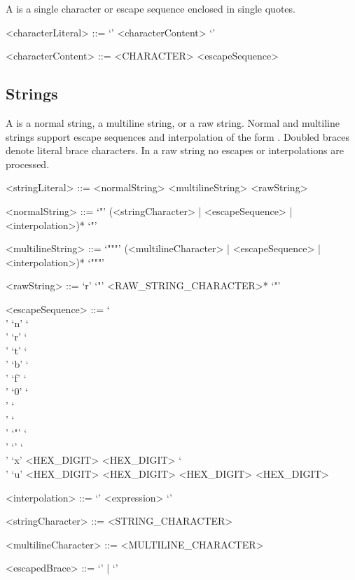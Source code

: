 \documentclass[makeidx]{article}
\begin{document}
\LMHash{}%
A  is a single character
or escape sequence enclosed in single quotes.

\begin{grammar}
<characterLiteral> ::= `\sq' <characterContent> `\sq'

<characterContent> ::= <CHARACTER>
  \alt <escapeSequence>
\end{grammar}

\subsection{Strings}

\LMHash{}%
A  is a normal string, a multiline string,
or a raw string.
Normal and multiline strings support escape sequences
and interpolation of the form .
Doubled braces denote literal brace characters.
In a raw string no escapes or interpolations are processed.

\begin{grammar}
<stringLiteral> ::= <normalString>
  \alt <multilineString>
  \alt <rawString>

<normalString> ::= `"' (<stringCharacter> | <escapeSequence>
  \gnewline{} | <interpolation>)* `"'

<multilineString> ::= `"""' (<multilineCharacter> | <escapeSequence>
  \gnewline{} | <interpolation>)* `"""'

<rawString> ::= `r' `"' <RAW\_STRING\_CHARACTER>* `"'

<escapeSequence> ::= `\\' `n'
  \alt `\\' `r'
  \alt `\\' `t'
  \alt `\\' `b'
  \alt `\\' `f'
  \alt `\\' `0'
  \alt `\\' `\\'
  \alt `\\' `"'
  \alt `\\' `\sq'
  \alt `\\' `x' <HEX\_DIGIT> <HEX\_DIGIT>
  \alt `\\' `u' <HEX\_DIGIT> <HEX\_DIGIT> <HEX\_DIGIT> <HEX\_DIGIT>

<interpolation> ::= `{' <expression> `}'

<stringCharacter> ::= <STRING\_CHARACTER>

<multilineCharacter> ::= <MULTILINE\_CHARACTER>

<escapedBrace> ::= `{{' | `}}'
\end{grammar}
\end{document}
